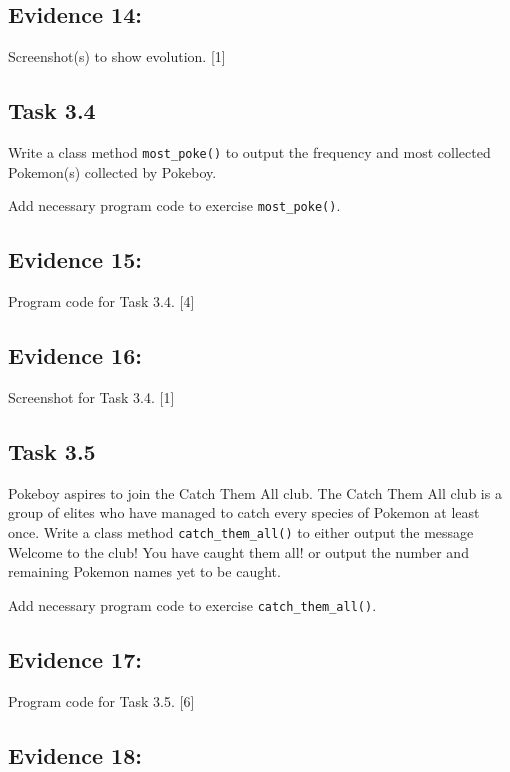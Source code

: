 \subsection*{Evidence 14:}

Screenshot(s) to show evolution.\hfill{} {[}1{]}

\subsection*{Task 3.4 }

Write a class method \texttt{most\_poke()} to output the frequency
and most collected Pokemon(s) collected by Pokeboy. 

Add necessary program code to exercise \texttt{most\_poke()}.

\subsection*{Evidence 15: }

Program code for Task 3.4.\hfill{} {[}4{]}

\subsection*{Evidence 16:}

Screenshot for Task 3.4. \hfill{}{[}1{]}

\subsection*{Task 3.5}

Pokeboy aspires to join the Catch Them All club. The Catch Them All
club is a group of elites who have managed to catch every species
of Pokemon at least once. Write a class method \texttt{catch\_them\_all()}
to either output the message \textquotedbl Welcome to the club! You
have caught them all!\textquotedbl{} or output the number and remaining
Pokemon names yet to be caught.

Add necessary program code to exercise \texttt{catch\_them\_all()}. 

\subsection*{Evidence 17:}

Program code for Task 3.5.\hfill{} {[}6{]}

\subsection*{Evidence 18: }

